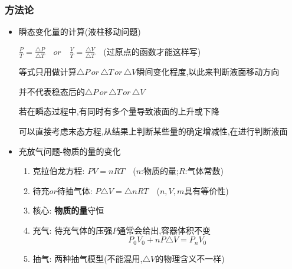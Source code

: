 \documentclass{article}
\begin{document}
\vspace{1em}

\subsubsection{方法论}

\begin{itemize}
    \item 瞬态变化量的计算(液柱移动问题)

          $ \frac{P}{T} = \frac{\triangle P}{\triangle T} \quad or \quad \frac{V}{T} = \frac{\triangle V}{\triangle T}  \quad $(过原点的函数才能这样写)

          等式只用做计算$\triangle P \,or\, \triangle T \, or \, \triangle V$瞬间变化程度,以此来判断液面移动方向

          并不代表稳态后的$\triangle P \,or\, \triangle T \,or\, \triangle V$

          若在瞬态过程中,有同时有多个量导致液面的上升或下降

          可以直接考虑末态方程,从结果上判断某些量的确定增减性,在进行判断液面

    \item 充放气问题-物质的量的变化
          \begin{enumerate}
              \item 克拉伯龙方程: $PV = n R T \quad $($n$:物质的量;$R$:气体常数)
              \item 待充$or$待抽气体: $P\triangle V = \triangle n RT \quad $($n,V,m$具有等价性)
              \item 核心: \textbf{物质的量}守恒
              \item 充气: 待充气体的压强$P$通常会给出,容器体积不变
                    $$
                        P_{0}V_{0} + n P\triangle{V} = P_{n}V_{0}
                    $$
              \item 抽气: 两种抽气模型(不能混用,$\triangle{V}$的物理含义不一样)
                    \begin{itemize}


\end{itemize}
\end{enumerate}
\end{itemize}
\end{document}

